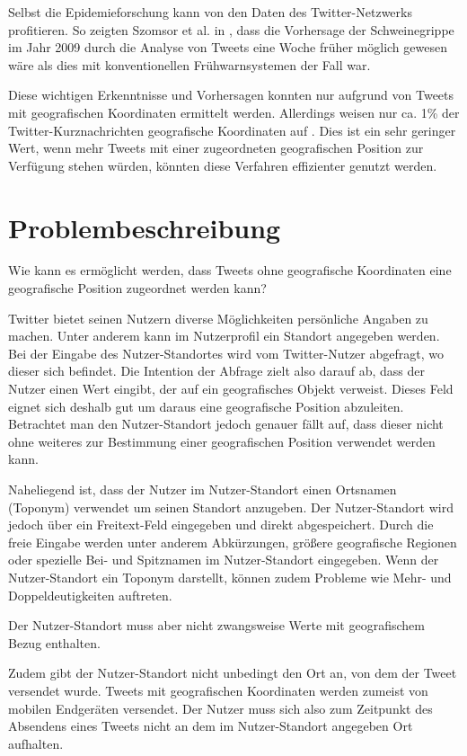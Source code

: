 		Selbst die Epidemieforschung kann von den Daten des Twitter-Netzwerks profitieren. 
		So zeigten Szomsor et al. in \cite{Szomszor2011}, dass die Vorhersage der Schweinegrippe im Jahr 2009 durch die Analyse von Tweets eine Woche früher möglich gewesen wäre als dies mit konventionellen Frühwarnsystemen der Fall war. 

 		Diese wichtigen Erkenntnisse und Vorhersagen konnten nur aufgrund von Tweets mit geografischen Koordinaten ermittelt werden.
 		Allerdings weisen nur ca. 1\% der Twitter-Kurznachrichten geografische Koordinaten auf \cite{Schulz2013}.
 		Dies ist ein sehr geringer Wert, wenn mehr Tweets mit einer zugeordneten geografischen Position zur Verfügung stehen würden, könnten diese Verfahren effizienter genutzt werden.
 		
	\section{Problembeschreibung} 

 		Wie kann es ermöglicht werden, dass Tweets ohne geografische Koordinaten eine geografische Position zugeordnet werden kann?

 		Twitter bietet seinen Nutzern diverse Möglichkeiten persönliche Angaben zu machen.
		Unter anderem kann im Nutzerprofil ein Standort angegeben werden. 
		Bei der Eingabe des Nutzer-Standortes wird vom Twitter-Nutzer abgefragt, wo dieser sich befindet. 
		Die Intention der Abfrage zielt also darauf ab, dass der Nutzer einen Wert eingibt, der auf ein geografisches Objekt verweist. 
		Dieses Feld eignet sich deshalb gut um daraus eine geografische Position abzuleiten.
		Betrachtet man den Nutzer-Standort jedoch genauer fällt auf, dass dieser nicht ohne weiteres zur Bestimmung einer geografischen Position verwendet werden kann.
		
		Naheliegend ist, dass der Nutzer im Nutzer-Standort einen Ortsnamen (Toponym) verwendet um seinen Standort anzugeben.
		Der Nutzer-Standort wird jedoch über ein Freitext-Feld eingegeben und direkt abgespeichert.
		Durch die freie Eingabe werden unter anderem Abkürzungen, größere geografische Regionen oder spezielle Bei- und Spitznamen im Nutzer-Standort eingegeben. 
		Wenn der Nutzer-Standort ein Toponym darstellt, können zudem Probleme wie Mehr- und Doppeldeutigkeiten auftreten.

		Der Nutzer-Standort muss aber nicht zwangsweise Werte mit geografischem Bezug enthalten. 

		Zudem gibt der Nutzer-Standort nicht unbedingt den Ort an, von dem der Tweet versendet wurde. 
		Tweets mit geografischen Koordinaten werden zumeist von mobilen Endgeräten versendet. 
		Der Nutzer muss sich also zum Zeitpunkt des Absendens eines Tweets nicht an dem im Nutzer-Standort angegeben Ort aufhalten.

